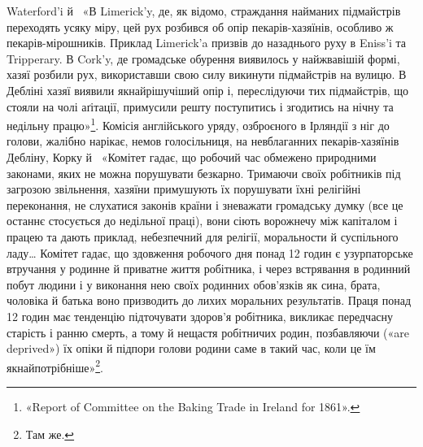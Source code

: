 \parcont{}  %
Waterford’i й~ «В Limerick’y, де, як відомо, страждання
найманих підмайстрів переходять усяку міру, цей рух розбився
об опір пекарів-хазяїнів, особливо ж пекарів-мірошників. Приклад
Limerick’a призвів до назаднього руху в Eniss’i та Tripperary.
В Cork’y, де громадське обурення виявилось у найжвавішій
формі, хазяї розбили рух, використавши свою силу викинути підмайстрів
на вулицю. В Дебліні хазяї виявили якнайрішучіший
опір і, переслідуючи тих підмайстрів, що стояли на чолі аґітації,
примусили решту поступитись і згодитись на нічну та недільну
працю»\footnote{
«Report of Committee on the Baking Trade in Ireland for 1861».
}. Комісія англійського уряду, озброєного в Ірляндії
з ніг до голови, жалібно нарікає, немов голосільниця, на невблаганних
пекарів-хазяїнів Дебліну, Корку й~ «Комітет гадає,
що робочий час обмежено природними законами, яких не можна
порушувати безкарно. Тримаючи своїх робітників під загрозою
звільнення, хазяїни примушують їх порушувати їхні релігійні
переконання, не слухатися законів країни і зневажати громадську
думку (все це останнє стосується до недільної праці), вони сіють
ворожнечу між капіталом і працею та дають приклад, небезпечний
для релігії, моральности й суспільного ладу\dots{} Комітет гадає,
що здовження робочого дня понад 12 годин є узурпаторське втручання
у родинне й приватне життя робітника, і через встрявання
в родинний побут людини і у виконання нею своїх родинних обов’язків
як сина, брата, чоловіка й батька воно призводить до лихих
моральних результатів. Праця понад 12 годин має тенденцію підточувати
здоров’я робітника, викликає передчасну старість і
ранню смерть, а тому й нещастя робітничих родин, позбавляючи
(«are deprived») їх опіки й підпори голови родини саме в такий
час, коли це їм якнайпотрібніше»\footnote{Там же.}.

